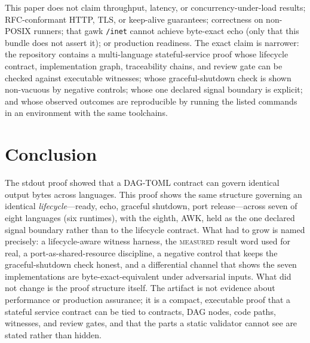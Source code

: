 \documentclass[11pt,letterpaper]{article}
\newcommand{\dagtoml}{DAG-TOML}
\newcommand{\measured}{\textsc{measured}}
\begin{document}
This paper does not claim throughput, latency, or concurrency-under-load
results; RFC-conformant HTTP, TLS, or keep-alive guarantees; correctness
on non-POSIX runners; that gawk \texttt{/inet} cannot achieve byte-exact
echo (only that this bundle does not assert it); or production readiness.
The exact claim is narrower: the repository contains a multi-language
stateful-service proof whose lifecycle contract, implementation graph,
traceability chains, and review gate can be checked against executable
witnesses; whose graceful-shutdown check is shown non-vacuous by negative
controls; whose one declared signal boundary is explicit; and whose
observed outcomes are reproducible by running the listed commands in an
environment with the same toolchains.

\section{Conclusion}

The stdout proof showed that a \dagtoml{} contract can govern identical
output bytes across languages. This proof shows the same structure
governing an identical \emph{lifecycle}---ready, echo, graceful
shutdown, port release---across seven of eight languages (six runtimes),
with the eighth, AWK, held as the one declared signal boundary rather
than to the lifecycle contract. What had to grow is named precisely: a
lifecycle-aware witness harness, the \measured{} result word used for
real, a port-as-shared-resource discipline, a negative control that
keeps the graceful-shutdown check honest, and a differential channel that
shows the seven implementations are byte-exact-equivalent under
adversarial inputs. What did not change is the proof structure itself. The artifact is not evidence about performance or
production assurance; it is a compact, executable proof that a stateful
service contract can be tied to contracts, DAG nodes, code paths,
witnesses, and review gates, and that the parts a static validator cannot
see are stated rather than hidden.



\end{document}
